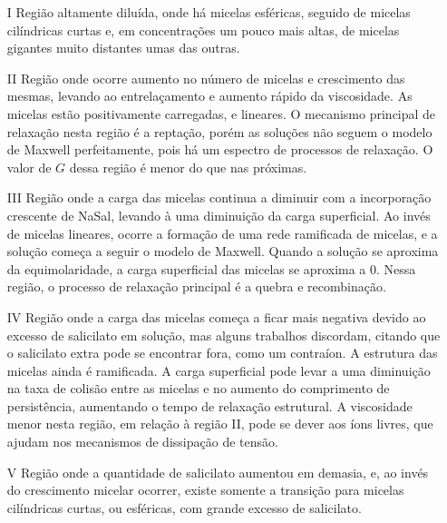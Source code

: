 		\begin{enumerate} 
			\item[I] Região altamente diluída, onde há micelas esféricas, seguido de micelas cilíndricas curtas e, em concentrações um pouco mais altas, de micelas gigantes muito distantes umas das outras.
			\item[II] Região onde ocorre aumento no número de micelas e crescimento das mesmas, levando ao entrelaçamento e aumento rápido da viscosidade. As micelas estão positivamente carregadas, e lineares. O mecanismo principal de relaxação nesta região é a reptação, porém as soluções não seguem o modelo de Maxwell perfeitamente, pois há um espectro de processos de relaxação. \cite{Rehage1988}
			 O valor de \(G\) dessa região é menor do que nas próximas. \cite{Rehage1991}
			\item[III] Região onde a carga das micelas continua a diminuir com a incorporação crescente de NaSal, levando à uma diminuição da carga superficial. Ao invés de micelas lineares, ocorre a formação de uma rede ramificada de micelas, e a solução começa a seguir o modelo de Maxwell. Quando a solução se aproxima da equimolaridade, a carga superficial das micelas se aproxima a 0. Nessa região, o processo de relaxação principal é a quebra e recombinação.
			\item[IV] Região onde a carga das micelas começa a ficar mais negativa devido ao excesso de salicilato em solução\cite{Olsson1986a}, mas alguns trabalhos discordam, citando que o salicilato extra pode se encontrar fora, como um contraíon.\cite{Cassidy1996} A estrutura das micelas ainda é ramificada. %
			A carga superficial pode levar a uma diminuição na taxa de colisão entre as micelas e no aumento do comprimento de persistência, aumentando o tempo de relaxação estrutural. A viscosidade menor nesta região, em relação à região II, pode se dever aos íons \Sal{} livres, que ajudam nos mecanismos de dissipação de tensão.\cite{Shikata1988} 
			\item[V] Região onde a quantidade de salicilato aumentou em demasia, e, ao invés do crescimento micelar ocorrer, existe somente a transição para micelas cilíndricas curtas, ou esféricas, com grande excesso de salicilato.
		\end{enumerate}
		
